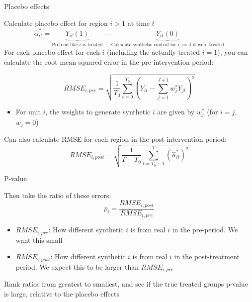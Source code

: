 \documentclass[compress, 8pt]{beamer}
\begin{document}
\begin{frame}{Placebo effects}

Calculate placebo effect for region $i > 1$ at time $t$
\begin{equation*}
    \hat{\alpha}^{*}_{it} = \underbrace{Y_{it} (1)}_{\text{Pretend like $i$ is treated}} - \underbrace{Y_{it} (0)}_{\text{Calculate synthetic control for $i$, as if it were treated}}
\end{equation*}
For each placebo effect for each $i$ (including the actually treated $i=1$), you can calculate the root mean squared error in the pre-intervention period:

\begin{equation*}
    RMSE_{i, pre} = \sqrt{\frac{1}{T_0} \sum_{t=0}^{T_0} \left( 
    Y_{it} - \sum_{j=1}^{J+1} w_j^* Y_{jt}
    \right)^2}
\end{equation*}
\begin{itemize}
    \item For unit $i$, the weights to generate synthetic $i$ are given by $w_j^*$ (for $i=j$, $w_j = 0$)
\end{itemize}
Can also calculate RMSE for each region in the post-intervention period:
\begin{equation*}
    RMSE_{i, post} = \sqrt{\frac{1}{T - T_0} \sum_{t=T_0 + 1}^{T} \left( \hat{\alpha}^{*}_{it} \right)^2}
\end{equation*}



\end{frame}

\begin{frame}{P-value}

Then take the ratio of these errors:
\begin{equation*}
    p_i = \frac{RMSE_{i, post}}{RMSE_{i, pre}}
\end{equation*}
\begin{itemize}
    \item $RMSE_{i, pre}$: How different synthetic $i$ is from real $i$ in the pre-period. We want this small
    \item $RMSE_{i, post}$: How different synthetic $i$ is from real $i$ in the post-treatment period. We expect this to be larger than $RMSE_{i,pre}$
\end{itemize}
Rank ratios from greatest to smallest, and see if the true treated groups p-value is large, relative to the placebo effects

\end{frame}
\end{document}
